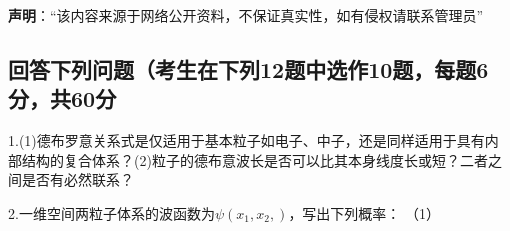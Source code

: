 
\textbf{声明}：“该内容来源于网络公开资料，不保证真实性，如有侵权请联系管理员”

\subsection{回答下列问题（考生在下列12题中选作10题，每题6分，共60分}

1.(1)德布罗意关系式是仅适用于基本粒子如电子、中子，还是同样适用于具有内部结构的复合体系？(2)粒子的德布意波长是否可以比其本身线度长或短？二者之间是否有必然联系？

2.一维空间两粒子体系的波函数为$\psi (x_1, x_2, )$，写出下列概率：
（1）